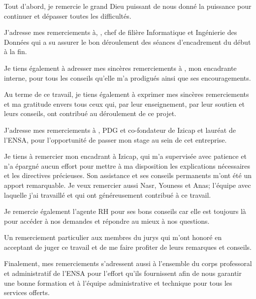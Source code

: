 \remerciements

Tout d’abord, je remercie le grand Dieu puissant de nous donné la puissance pour continuer et dépasser toutes les difficultés.

\medskip

J’adresse mes remerciements à, \textbf{}, chef de filière Informatique et Ingénierie des Données qui a su assurer le bon déroulement des séances d’encadrement du début à la fin.

\medskip

Je tiens également à adresser mes sincères remerciements à \textbf{}, mon encadrante interne, pour tous les conseils qu’elle m’a prodigués ainsi que ses encouragements.

\medskip

Au terme de ce travail, je tiens également à exprimer mes sincères remerciements et ma gratitude envers tous ceux qui, par leur enseignement, par leur soutien et leurs conseils, ont contribué au déroulement de ce projet.

\medskip

J’adresse mes remerciements à \textbf{}, PDG et co-fondateur de Izicap et lauréat de l’ENSA, pour l’opportunité de passer mon stage au sein de cet entreprise.

\medskip

Je tiens à remercier mon encadrant à Izicap, \textbf{} qui m’a supervisée avec patience et n’a épargné aucun effort pour mettre à ma disposition les explications nécessaires et les directives précieuses. Son assistance et ses conseils permanents m’ont été un apport remarquable. Je veux remercier aussi Nasr, Youness et Anas; l’équipe avec laquelle j’ai travaillé et qui ont généreusement contribué à ce travail.

\medskip

Je remercie également l'agente RH \textbf{} pour ses bons conseils car elle est toujours là pour accéder à nos demandes et répondre au mieux à nos questions.

\medskip

Un remerciement particulier aux membres du jurys qui m’ont honoré en acceptant de juger ce travail et de me faire profiter de leurs remarques et conseils.

\medskip

Finalement, mes remerciements s’adressent aussi à l’ensemble du corps professoral et administratif de l’ENSA pour l’effort qu’ils fournissent afin de nous garantir une bonne formation et à l’équipe administrative et technique pour tous les services offerts.